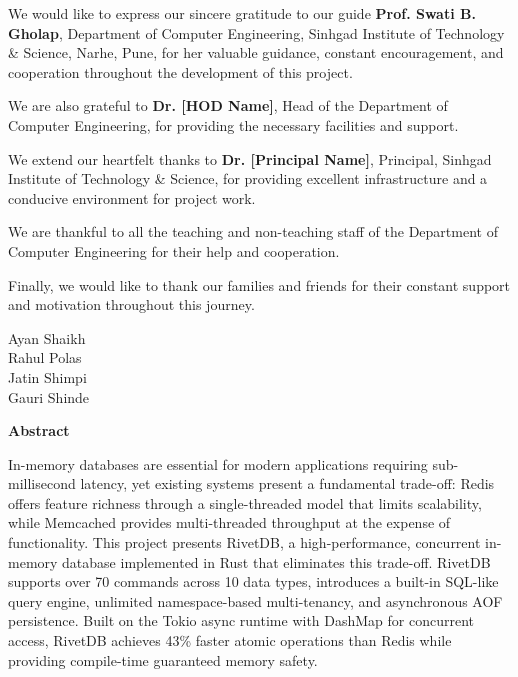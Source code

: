 \documentclass[12pt,a4paper]{report}
\begin{document}
We would like to express our sincere gratitude to our guide \textbf{Prof. Swati B. Gholap}, Department of Computer Engineering, Sinhgad Institute of Technology \& Science, Narhe, Pune, for her valuable guidance, constant encouragement, and cooperation throughout the development of this project.

We are also grateful to \textbf{Dr. [HOD Name]}, Head of the Department of Computer Engineering, for providing the necessary facilities and support.

We extend our heartfelt thanks to \textbf{Dr. [Principal Name]}, Principal, Sinhgad Institute of Technology \& Science, for providing excellent infrastructure and a conducive environment for project work.

We are thankful to all the teaching and non-teaching staff of the Department of Computer Engineering for their help and cooperation.

Finally, we would like to thank our families and friends for their constant support and motivation throughout this journey.

\vspace{4\baselineskip}

\begin{flushright}
Ayan Shaikh\\
Rahul Polas\\
Jatin Shimpi\\
Gauri Shinde\\
\end{flushright}

\newpage
\thispagestyle{plain}
\begin{center}
{\fontsize{12}{14}\selectfont \textbf{Abstract}}
\end{center}
In-memory databases are essential for modern applications requiring sub-millisecond latency, yet existing systems present a fundamental trade-off: Redis offers feature richness through a single-threaded model that limits scalability, while Memcached provides multi-threaded throughput at the expense of functionality. This project presents RivetDB, a high-performance, concurrent in-memory database implemented in Rust that eliminates this trade-off. RivetDB supports over 70 commands across 10 data types, introduces a built-in SQL-like query engine, unlimited namespace-based multi-tenancy, and asynchronous AOF persistence. Built on the Tokio async runtime with DashMap for concurrent access, RivetDB achieves 43\% faster atomic operations than Redis while providing compile-time guaranteed memory safety.
\end{document}

